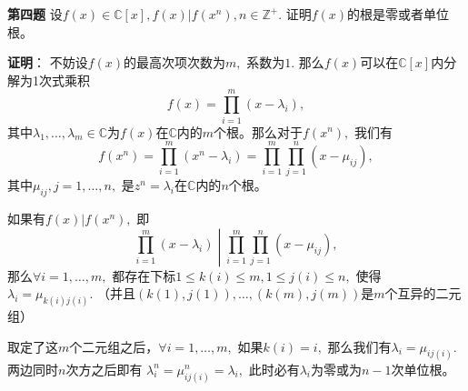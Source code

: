 \fi  %

\newpageorvspace

{\bf 第四题} 设$f(x) \in \mathbb{C}[x], f(x) | f(x^n), n \in \mathbb{Z}^+.$ 证明$f(x)$的根是零或者单位根。

\ifIncludeAnswer

\newpageorvspace

{\bf 证明}： 不妨设$f(x)$的最高次项次数为$m,$ 系数为$1.$ 那么$f(x)$可以在$\mathbb{C}[x]$内分解为1次式乘积
$$f(x) = \prod\limits_{i=1}^m (x - \lambda_i),$$
其中$\lambda_1, \ldots, \lambda_m \in \mathbb{C}$为$f(x)$在$\mathbb{C}$内的$m$个根。那么对于$f(x^n),$ 我们有
$$f(x^n) = \prod\limits_{i=1}^m (x^n - \lambda_i) = \prod\limits_{i=1}^m \prod\limits_{j=1}^n (x - \mu_{ij}),$$
其中$\mu_{ij}, j = 1, \ldots, n,$ 是$z^n = \lambda_i$在$\mathbb{C}$内的$n$个根。

如果有$f(x) | f(x^n),$ 即
$$\left.\prod\limits_{i=1}^m (x - \lambda_i) \middle| \prod\limits_{i=1}^m \prod\limits_{j=1}^n (x - \mu_{ij}) \right.,$$
那么$\forall i = 1, \ldots, m,$ 都存在下标$1 \leqslant k(i) \leqslant m, 1 \leqslant j(i) \leqslant n,$ 使得$\lambda_i = \mu_{k(i)j(i)}.$ （并且$(k(1), j(1)), \ldots, (k(m), j(m))$是$m$个互异的二元组）

取定了这$m$个二元组之后，$\forall i = 1, \ldots, m,$ 如果$k(i) = i,$ 那么我们有$\lambda_i = \mu_{ij(i)}.$ 两边同时$n$次方之后即有
$\lambda_i^n = \mu_{ij(i)}^n = \lambda_i,$ 此时必有$\lambda_i$为零或为$n - 1$次单位根。

